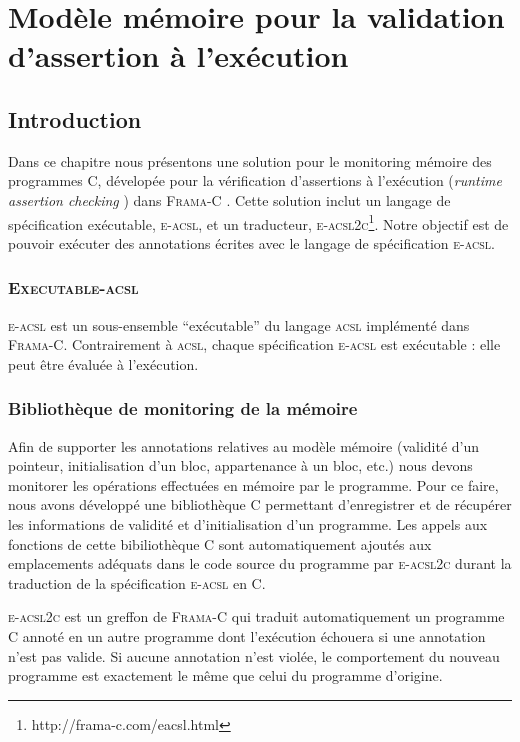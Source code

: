
\chapter{Modèle mémoire pour la validation d'assertion à l'exécution}




\section{Introduction}


Dans ce chapitre nous présentons une solution pour le monitoring mémoire des
programmes C, dévelopée pour la vérification d'assertions à l'exécution
({\em runtime assertion checking} \cite{TODO}) dans \textsc{Frama-C}
\cite{Frama-C}.
Cette solution inclut un langage de spécification exécutable, \textsc{e-acsl},
et un traducteur, \textsc{e-acsl2c}\footnote{http://frama-c.com/eacsl.html}.
Notre objectif est de pouvoir exécuter des annotations écrites avec le langage
de spécification \textsc{e-acsl}.

\subsection{\textsc{Executable-acsl}}

\textsc{e-acsl} est un sous-ensemble ``exécutable'' du langage \textsc{acsl}
implémenté dans \textsc{Frama-C}. Contrairement à \textsc{acsl}, chaque
spécification \textsc{e-acsl} est exécutable : elle peut être évaluée à
l'exécution.

\subsection{Bibliothèque de monitoring de la mémoire}

Afin de supporter les annotations relatives au modèle mémoire (validité d'un
pointeur, initialisation d'un bloc, appartenance à un bloc, etc.) nous devons
monitorer les opérations effectuées en mémoire par le programme. Pour ce faire,
nous avons développé une bibliothèque C permettant d'enregistrer et de récupérer
les informations de validité et d'initialisation d'un programme. Les appels aux
fonctions de cette bibiliothèque C sont automatiquement ajoutés aux emplacements
adéquats dans le code source du programme par \textsc{e-acsl2c} durant la
traduction de la spécification \textsc{e-acsl} en C.

\textsc{e-acsl2c} est un greffon de \textsc{Frama-C} qui traduit automatiquement
un programme C annoté en un autre programme dont l'exécution échouera si une
annotation n'est pas valide. Si aucune annotation n'est violée, le comportement
du nouveau programme est exactement le même que celui du programme d'origine.




